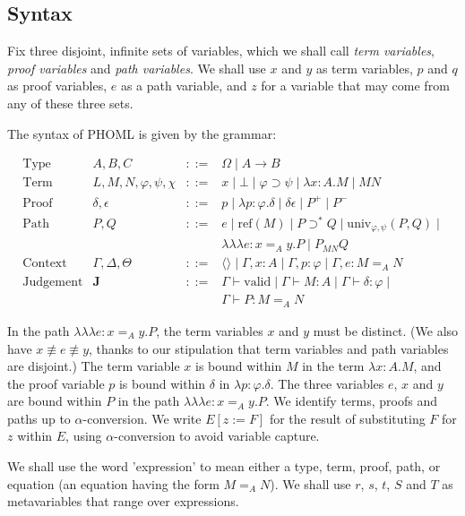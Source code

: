 \documentclass[a4paper,UKenglish]{lipics-v2016}
\newcommand*{\reff}[1]{\ensuremath{\mathrm{ref} \left( {#1} \right)}}
\newcommand*{\univ}[4]{\ensuremath{\mathrm{univ}_{{#1}, {#2}} \left({#3} , {#4} \right)}}
\newcommand*{\triplelambda}{\ensuremath{\lambda \!\! \lambda \!\! \lambda}}
\newcommand*{\vald}{\ensuremath{\vdash \mathrm{valid}}}
\theoremstyle{plain}
\theoremstyle{definition}
\begin{document}
\subsection{Syntax}

Fix three disjoint, infinite sets of variables, which we shall call \emph{term variables}, \emph{proof variables}
and \emph{path variables}.  We shall use $x$ and $y$ as term variables, $p$ and $q$ as proof variables,
$e$ as a path variable, and $z$ for a variable that may come from any of these three sets.

The syntax of PHOML is given by the grammar:

\[
\begin{array}{lrcl}
\text{Type} & A,B,C & ::= & \Omega \mid A \rightarrow B \\
\text{Term} & L,M,N, \varphi,\psi,\chi & ::= & x \mid \bot \mid \varphi \supset \psi \mid \lambda x:A.M \mid MN \\
\text{Proof} & \delta, \epsilon & ::= & p \mid \lambda p:\varphi.\delta \mid \delta \epsilon \mid P^+ \mid P^- \\
\text{Path} & P, Q & ::= & e \mid \reff{M} \mid P \supset^* Q \mid \univ{\varphi}{\psi}{P}{Q} \mid \\
& & & \triplelambda e : x =_A y. P \mid P_{MN} Q \\
\text{Context} & \Gamma, \Delta, \Theta & ::= & \langle \rangle \mid \Gamma, x : A \mid \Gamma, p : \varphi \mid \Gamma, e : M =_A N \\
\text{Judgement} & \mathbf{J} & ::= & \Gamma \vald \mid \Gamma \vdash M : A \mid \Gamma \vdash \delta : \varphi \mid \\
& & & \Gamma \vdash P : M =_A N
\end{array}
\]

In the path $\triplelambda e : x =_A y . P$, the term variables $x$ and $y$ must be distinct.  (We also have $x \not\equiv e \not\equiv y$, thanks to our
stipulation that term variables and path variables are disjoint.)  The term variable $x$ is bound within $M$ in the term $\lambda x:A.M$,
and the proof variable $p$ is bound within $\delta$ in $\lambda p:\varphi.\delta$.  The three variables $e$, $x$ and $y$ are bound within $P$ in the path
$\triplelambda e:x =_A y.P$.  We identify terms, proofs and paths up to $\alpha$-conversion.  We write $E[z:=F]$ for the result of substituting $F$ for $z$ within
$E$, using $\alpha$-conversion to avoid variable capture.

We shall use the word 'expression' to mean either a type, term, proof, path, or equation (an equation having the form $M =_A N$).  We shall use $r$, $s$, $t$, $S$ and $T$ as metavariables that range over expressions.
\end{document}
